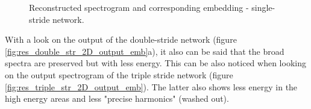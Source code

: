 \begin{figure}[htb!]
    \centering
    \captionsetup{justification=centering}
    \caption{Reconstructed spectrogram and corresponding embedding - single-stride network.}
    \label{fig:res_single_str_2D_output_emb}
\end{figure}

With a look on the output of the double-stride network (figure \ref{fig:res_double_str_2D_output_emb}a), it also can be said that the broad spectra are preserved but with less energy. This can be also noticed when looking on the output spectrogram of the triple stride network (figure \ref{fig:res_triple_str_2D_output_emb}). The latter also shows less energy in the high energy areas and less "precise harmonics" (washed out). 

